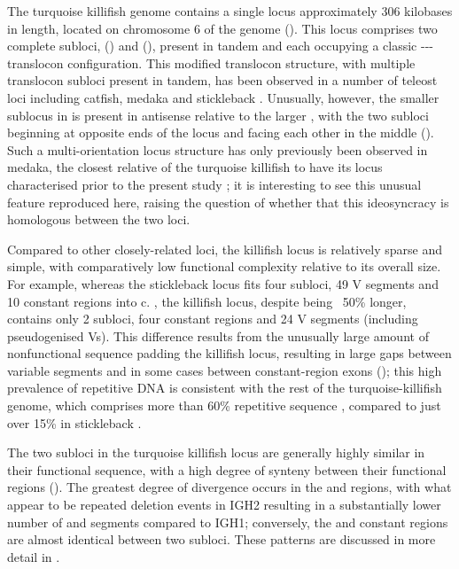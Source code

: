 The turquoise killifish genome contains a single \igh{} locus approximately 306 kilobases in length, located on chromosome 6 of the \Nfu genome (). This locus comprises two complete subloci,  () and  (), present in tandem and each occupying a classic {\vh-\dh-\jh-\ch} translocon configuration. This modified translocon structure, with multiple translocon subloci present in tandem, has been observed in a number of teleost \igh{} loci including catfish, medaka and stickleback \parencite{fillatreau2013astonishing}. Unusually, however, the smaller  sublocus in \nfu \igh{} is present in antisense relative to the larger , with the two subloci beginning at opposite ends of the locus and facing each other in the middle (). Such a multi-orientation locus structure has only previously been observed in medaka, the closest relative of the turquoise killifish to have its locus characterised prior to the present study \parencite{magadan2011medaka}; it is interesting to see this unusual feature reproduced here, raising the question of whether that this ideosyncracy is homologous between the two loci.
	
Compared to other closely-related loci, the killifish locus is relatively sparse and simple, with comparatively low functional complexity relative to its overall size. For example, whereas the stickleback locus fits four subloci, 49 V segments and 10 constant regions into c.  \parencite{bao2010stickleback,gambondeza2011stickleback}, the killifish locus, despite being ~50\% longer, contains only 2 subloci, four constant regions and 24 V segments (including pseudogenised Vs). This difference results from the unusually large amount of nonfunctional sequence padding the killifish locus, resulting in large gaps between variable segments and in some cases between constant-region exons (); this high prevalence of repetitive DNA is consistent with the rest of the turquoise-killifish genome, which comprises more than 60\% repetitive sequence \parencite{willemsen2019popgen}, compared to just over 15\% in stickleback \parencite{yuan2018repeats}. %
	
The two subloci in the turquoise killifish locus are generally highly similar in their functional sequence, with a high degree of synteny between their functional regions (). The greatest degree of divergence occurs in the \vh and \dh regions, with what appear to be repeated deletion events in IGH2 resulting in a substantially lower number of \vh and \dh segments compared to IGH1; conversely, the \jh and constant regions are almost identical between two subloci. These patterns are discussed in more detail in .
	
